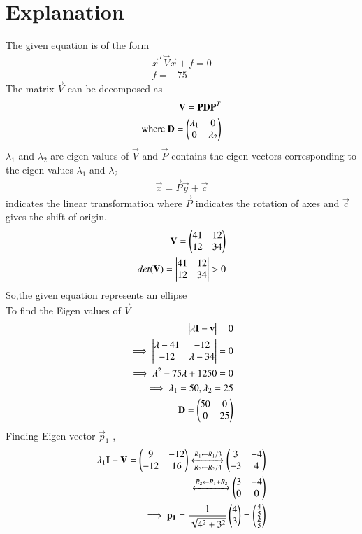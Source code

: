 \documentclass[journal,12pt,twocolumn]{IEEEtran}
\begin{document}
\section {Explanation}
The given equation is of the form
\begin{align}
   \vec{x}^T\vec{V}\vec{x}+f=0\\
   f=-75
\end{align}
The matrix $\vec{V}$ can be decomposed as
\begin{align}
    \mathbf{V}=\mathbf{P}\mathbf{D}\mathbf{P}^T\label{2}\\
    \text{where  }\mathbf{D}=\begin{pmatrix}\lambda_1&0\\0&\lambda_2\end{pmatrix}
\end{align}
$\lambda_1$ and $\lambda_2$ are eigen values of $\vec{V}$  and
$\vec{P}$ contains the eigen vectors corresponding to the eigen values $\lambda_1$ and $\lambda_2$
\begin{align}
\vec{x}=\vec{P}\vec{y}+\vec{c}
\end{align}
indicates the linear transformation where $\vec{P}$ indicates the rotation of axes and $\vec{c}$ gives the shift of origin.
\begin{align}
  \mathbf{V}=\begin{pmatrix}41&12\\12&34\end{pmatrix}\\
  det(\mathbf{V} )=\begin{vmatrix}41&12\\12&34\end{vmatrix}>0
\end{align}
So,the given equation represents an ellipse\\
To find the Eigen values of $\vec{V}$
\begin{align}
    \begin{vmatrix}\lambda\mathbf{I}-\mathbf{v}\end{vmatrix}=0\\
    \implies \begin{vmatrix}\lambda-41&-12\\-12&\lambda-34\end{vmatrix}=0\\
    \implies \lambda^2-75\lambda+1250=0\\
    \implies \lambda_1=50,\lambda_2=25\\
    \mathbf{D}=\begin{pmatrix}50&0\\0&25\end{pmatrix}
\end{align}
Finding Eigen vector $\vec{p}_1$ ,
\begin{align}
\lambda_1\mathbf{I}-\mathbf{V}= \begin{pmatrix}9&-12\\-12&16\end{pmatrix}\xleftrightarrow[R_2\leftarrow R_2/4]{R_1\leftarrow R_1/3}\begin{pmatrix}3&-4\\-3&4\end{pmatrix}\\
\xleftrightarrow[]{R_2\leftarrow R_1+R_2}\begin{pmatrix}3&-4\\0&0\end{pmatrix}\\
\implies \mathbf{p_1}=\frac{1}{\sqrt{4^2+3^2}}\begin{pmatrix}4\\3\end{pmatrix}=\begin{pmatrix}\frac{4}{5}\\\frac{3}{5}\end{pmatrix}
\end{align}
\end{document}
